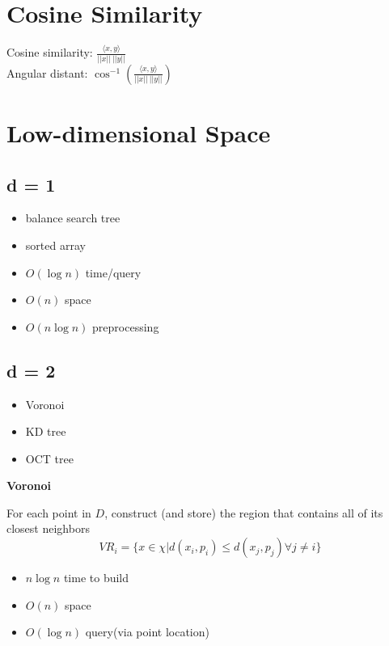 \documentclass[12pt]{article}
\begin{document}
\section{Cosine Similarity}
Cosine similarity: $
\frac{\langle x,y \rangle}{||x||\: ||y||}
$\\
Angular distant: $\cos^{-1}(\frac{\langle x,y \rangle}{||x||\: ||y||})$

\section{Low-dimensional Space}
	
		\subsection{d = 1}
		\begin{itemize}
			\item balance search tree
			\item sorted array
			\item $O(\log n)$ time/query
			\item $O(n)$ space
			\item $O(n\log n)$ preprocessing
		\end{itemize}
		\subsection{d = 2}
		\begin{itemize}
			\item Voronoi
			\item KD tree
			\item OCT tree
		\end{itemize}
	
\textbf{Voronoi}

For each point in $D$, construct (and store) the region that contains all of its closest neighbors
$$
VR_i = \{ x\in \chi | d(x_i,p_i)\leq d(x_j, p_j) \forall j \neq i \}
$$
\begin{itemize}
	\item $n \log n$ time to build
	\item $O(n)$ space
	\item $O(\log n)$ query(via point location)
\end{itemize}
\end{document}

